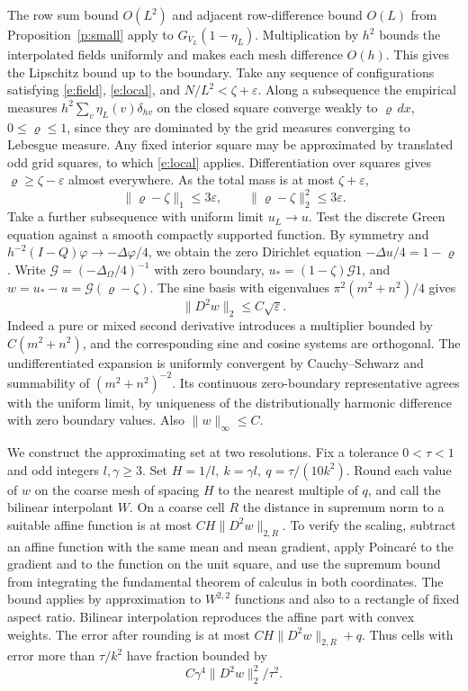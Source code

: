 \documentclass[11pt]{amsart}
\newcommand{\1}{\mathbf 1}
\newcommand{\calG}{\mathcal G}
\begin{document}
The row sum bound \(O(L^2)\) and adjacent row-difference bound \(O(L)\) from Proposition~\ref{p:small} apply to \(G_{V_L}(1-\eta_L)\). Multiplication by \(h^2\) bounds the interpolated fields uniformly and makes each mesh difference \(O(h)\). This gives the Lipschitz bound up to the boundary. Take any sequence of configurations satisfying \eqref{e:field}, \eqref{e:local}, and \(N/L^2<\zeta+\varepsilon\). Along a subsequence the empirical measures \(h^2\sum_v\eta_L(v)\delta_{hv}\) on the closed square converge weakly to \(\varrho\,dx\), \(0\le\varrho\le1\), since they are dominated by the grid measures converging to Lebesgue measure. Any fixed interior square may be approximated by translated odd grid squares, to which \eqref{e:local} applies. Differentiation over squares gives \(\varrho\ge\zeta-\varepsilon\) almost everywhere. As the total mass is at most \(\zeta+\varepsilon\),
\[
 \|\varrho-\zeta\|_1\le 3\varepsilon,\qquad
 \|\varrho-\zeta\|_2^2\le3\varepsilon .
\]
Take a further subsequence with uniform limit \(u_L\to u\). Test the discrete Green equation against a smooth compactly supported function. By symmetry and \(h^{-2}(I-Q)\varphi\to-\Delta\varphi/4\), we obtain the zero Dirichlet equation \(-\Delta u/4=1-\varrho\). Write \(\calG=(-\Delta_\Omega/4)^{-1}\) with zero boundary, \(u_*=(1-\zeta)\calG1\), and \(w=u_*-u=\calG(\varrho-\zeta)\). The sine basis with eigenvalues \(\pi^2(m^2+n^2)/4\) gives
\begin{equation}\label{e:hess}
 \|D^2w\|_2\le C\sqrt\varepsilon.
\end{equation}
Indeed a pure or mixed second derivative introduces a multiplier bounded by \(C(m^2+n^2)\), and the corresponding sine and cosine systems are orthogonal. The undifferentiated expansion is uniformly convergent by Cauchy--Schwarz and summability of \((m^2+n^2)^{-2}\). Its continuous zero-boundary representative agrees with the uniform limit, by uniqueness of the distributionally harmonic difference with zero boundary values. Also \(\|w\|_\infty\le C\).

We construct the approximating set at two resolutions. Fix a tolerance \(0<\tau<1\) and odd integers \(l,\gamma\ge3\). Set \(H=1/l,\ k=\gamma l,\ q=\tau/(10k^2)\). Round each value of \(w\) on the coarse mesh of spacing \(H\) to the nearest multiple of \(q\), and call the bilinear interpolant \(W\). On a coarse cell \(R\) the distance in supremum norm to a suitable affine function is at most \(CH\|D^2 w\|_{2,R}\). To verify the scaling, subtract an affine function with the same mean and mean gradient, apply Poincaré to the gradient and to the function on the unit square, and use the supremum bound from integrating the fundamental theorem of calculus in both coordinates. The bound applies by approximation to \(W^{2,2}\) functions and also to a rectangle of fixed aspect ratio. Bilinear interpolation reproduces the affine part with convex weights. The error after rounding is at most \(C H\|D^2w\|_{2,R}+q\). Thus cells with error more than \(\tau/k^2\) have fraction bounded by
\begin{equation}\label{e:bad}
 C\gamma^4\|D^2w\|_2^2/\tau^2.
\end{equation}
\end{document}
